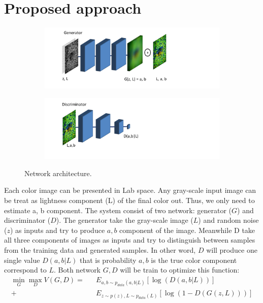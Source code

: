 \documentclass[10pt,twocolumn,letterpaper]{article}
\begin{document}
\section{Proposed approach}


\begin{figure} [t!]
    \centering
    \begin{subfigure}[b]{0.48\textwidth}
        \includegraphics[trim=30 20 150 0, clip,width=\textwidth]{img/Generator.pdf}
    \end{subfigure}
    \begin{subfigure}[b]{0.48\textwidth}
        \includegraphics[trim=30 20 150 0, clip,width=\textwidth]{img/Discriminator.pdf}
    \end{subfigure}
    \vspace{-0.16in}
    \caption{\small Network architecture.}
    \vspace{-0.2in}
   \label{fig:dataPartition}
\end{figure}

Each color image can be presented in Lab space. Any gray-scale input image can be treat as lightness component (L) of the final color out. Thus, we only need to estimate a, b component. The system consist of two network: generator ($G$) and discriminator ($D$). The generator take the gray-scale image ($L$) and random noise ($z$) as inputs and try to produce $a, b$ component of the image. Meanwhile D take all three components of images as inputs and try to distinguish between samples from the training data and generated samples. In other word, $D$ will produce one single value $D(a,b|L)$ that is probability $a, b$ is the true color component correspond to $L$. Both network $G, D$ will be train to optimize this function:
\begin{eqnarray*}
 \min_{G} \max_{D} V(G,D) = &&E_{a, b \sim p_{data}(a,b | L)} [\log(D(a,b|L))] \\
                          + &&E_{z \sim p(z), L \sim p_{data}(L) } [\log(1-D(G(z,L)))]
\end{eqnarray*}
\end{document}
